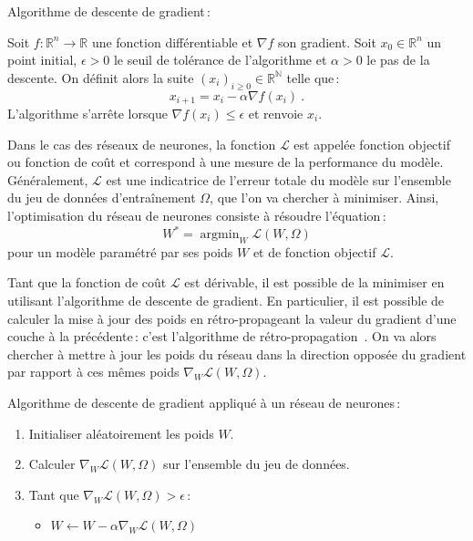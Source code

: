 \begin{definition}
  \label{eq:sgd}
  Algorithme de descente de gradient\,:

  Soit $f : \mathbb{R}^n \rightarrow \mathbb{R}$ une fonction différentiable et $\nabla f$ son gradient. Soit $x_0 \in \mathbb{R}^n$ un point initial, $\epsilon > 0$ le seuil de tolérance de l'algorithme et $\alpha > 0$ le pas de la descente. On définit alors la suite $(x_i)_{i \ge 0} \in \mathbb{R}^\mathbb{N}$ telle que\,:
  $$x_{i+1} = x_i - \alpha \nabla f(x_i)~.$$
  L'algorithme s'arrête lorsque $\nabla f(x_i) \le \epsilon$ et renvoie $x_i$.
\end{definition}

\def\L{\mathcal{L}}

Dans le cas des réseaux de neurones, la fonction $\L$ est appelée \og fonction objectif \fg ou \og fonction de coût \fg et correspond à une mesure de la performance du modèle. Généralement, $\L$ est une indicatrice de l'erreur totale du modèle sur l'ensemble du jeu de données d'entraînement $\Omega$, que l'on va chercher à minimiser. Ainsi, l'optimisation du réseau de neurones consiste à résoudre l'équation\,:
$$W^* = \operatorname{argmin}_W \L(W, \Omega)$$
pour un modèle paramétré par ses poids $W$ et de fonction objectif $\L$.

Tant que la fonction de coût $\L$ est dérivable, il est possible de la minimiser en utilisant l'algorithme de descente de gradient. En particulier, il est possible de calculer la mise à jour des poids en rétro-propageant la valeur du gradient d'une couche à la précédente\,: c'est l'algorithme de rétro-propagation~\cite{werbos_beyond_1975,lecun_efficient_1998,rumelhart_learning_1986}. On va alors chercher à mettre à jour les poids du réseau dans la direction opposée du gradient par rapport à ces mêmes poids $\nabla_W \L(W, \Omega)$.

\begin{definition}
  Algorithme de descente de gradient appliqué à un réseau de neurones\,:
  \begin{enumerate}
    \item Initialiser aléatoirement les poids $W$.
    \item Calculer $\nabla_W \L(W, \Omega)$ sur l'ensemble du jeu de données.
    \item Tant que $\nabla_W \L(W, \Omega) > \epsilon$\,:
      \begin{itemize}
          \item $W \leftarrow W - \alpha \nabla_W \L(W, \Omega)$
      \end{itemize}
  \end{enumerate}
\end{definition}


